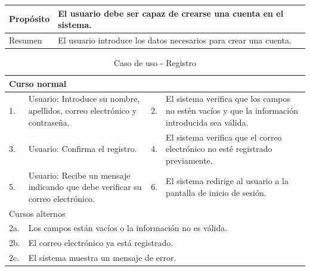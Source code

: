 \begin{table}[H]
	\centering
	\begin{tabular}{| m{} | m{} | m{} | m{} |}
		\hline
		Propósito & \multicolumn{3}{m{0.67\textwidth}|}{El usuario debe ser capaz de crearse una cuenta en el sistema.}   \\ 
		\hline
		Resumen & \multicolumn{3}{m{0.67\textwidth}|}{El usuario introduce los datos necesarios para crear una cuenta.} \\ 
		\hline
	\end{tabular}
\end{table}

\begin{table}[H]
	\centering
	\begin{tabular}{| m{} | m{} | m{} | m{} |}
		\hline
		\multicolumn{4}{|m{0.9\textwidth}|}{Curso normal}     \\ 
		\hline
		1. & Usuario: Introduce su nombre, apellidos, correo electrónico y contraseña. 
        & 2. & El sistema verifica que los campos no estén vacíos y que la información introducida sea válida. \\ 
		\hline
		3. & Usuario: Confirma el registro. & 4. & El sistema verifica que el correo electrónico no esté registrado previamente.   \\ 
		\hline
        5. & Usuario: Recibe un mensaje indicando que debe verificar su correo electrónico. & 6. & El sistema redirige al usuario a la pantalla de inicio de sesión. \\ 
        \hline
		\multicolumn{4}{|m{0.9\textwidth}|}{Cursos alternos}     \\
        \hline 
        2a. & \multicolumn{3}{l|}{Los campos están vacíos o la información no es válida.} \\ 
        \hline
        2b. & \multicolumn{3}{l|}{El correo electrónico ya está registrado.} \\ 
        \hline
        2c. & \multicolumn{3}{l|}{El sistema muestra un mensaje de error.} \\ 
        \hline
	\end{tabular}
	\caption{Caso de uso - Registro}
\end{table}

